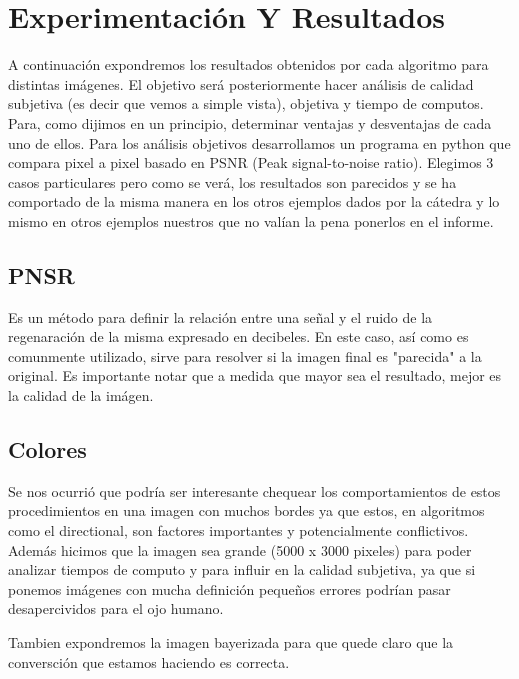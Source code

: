 \section{Experimentación Y Resultados}

A continuación expondremos los resultados obtenidos por cada algoritmo para distintas imágenes. El objetivo será posteriormente hacer análisis de calidad subjetiva (es decir que vemos a simple vista), objetiva y tiempo de computos. Para, como dijimos en un principio, determinar ventajas y desventajas de cada uno de ellos. Para los análisis objetivos desarrollamos un programa en python que compara pixel a pixel basado en PSNR (Peak signal-to-noise ratio). Elegimos 3 casos particulares pero como se verá, los resultados son parecidos y se ha comportado de la misma manera en los otros ejemplos dados por la cátedra y lo mismo en otros ejemplos nuestros que no valían la pena ponerlos en el informe.

\subsection{PNSR}
Es un método para definir la relación entre una señal y el ruido de la regenaración de la misma expresado en decibeles. En este caso, así como es comunmente utilizado, sirve para resolver si la imagen final es "parecida" a la original. Es importante notar que a medida que mayor sea el resultado, mejor es la calidad de la imágen.

\subsection{Colores}


Se nos ocurrió que podría ser interesante chequear los comportamientos de estos procedimientos en una imagen con muchos bordes ya que estos, en algoritmos como el directional, son factores importantes y potencialmente conflictivos. Además hicimos que la imagen sea grande (5000 x 3000 pixeles) para poder analizar tiempos de computo y para influir en la calidad subjetiva, ya que si ponemos imágenes con mucha definición pequeños errores podrían pasar desapercividos para el ojo humano.

Tambien expondremos la imagen bayerizada para que quede claro que la conversción que estamos haciendo es correcta.

